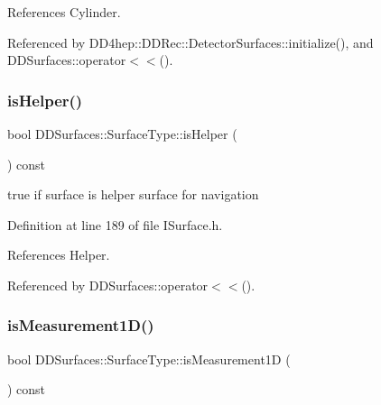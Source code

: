 References Cylinder.



Referenced by D\+D4hep\+::\+D\+D\+Rec\+::\+Detector\+Surfaces\+::initialize(), and D\+D\+Surfaces\+::operator$<$$<$().

\hypertarget{class_d_d_surfaces_1_1_surface_type_a136786219b91481212599fb88d82d59c}{}\label{class_d_d_surfaces_1_1_surface_type_a136786219b91481212599fb88d82d59c} 
\subsubsection{\texorpdfstring{is\+Helper()}{isHelper()}}
{\footnotesize\ttfamily bool D\+D\+Surfaces\+::\+Surface\+Type\+::is\+Helper (\begin{DoxyParamCaption}{ }\end{DoxyParamCaption}) const\hspace{0.3cm}{\ttfamily [inline]}}



true if surface is helper surface for navigation 



Definition at line 189 of file I\+Surface.\+h.



References Helper.



Referenced by D\+D\+Surfaces\+::operator$<$$<$().

\hypertarget{class_d_d_surfaces_1_1_surface_type_adb0556d602e0ef8ed33d88a4fd731375}{}\label{class_d_d_surfaces_1_1_surface_type_adb0556d602e0ef8ed33d88a4fd731375} 
\subsubsection{\texorpdfstring{is\+Measurement1\+D()}{isMeasurement1D()}}
{\footnotesize\ttfamily bool D\+D\+Surfaces\+::\+Surface\+Type\+::is\+Measurement1D (\begin{DoxyParamCaption}{ }\end{DoxyParamCaption}) const\hspace{0.3cm}{\ttfamily [inline]}}



